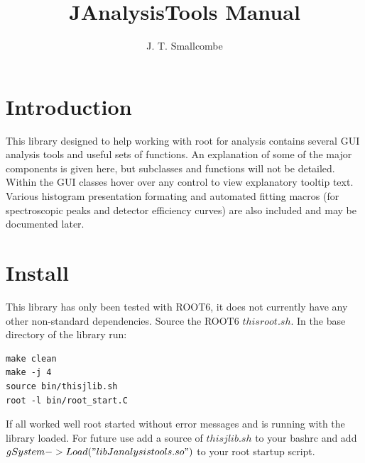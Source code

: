 \documentclass[a4paper,10pt]{article}
\title{JAnalysisTools Manual}
\author{J. T. Smallcombe}
\begin{document}
\maketitle
\tableofcontents

\section{Introduction}
This library designed to help working with root for analysis contains several GUI analysis tools and useful sets of functions. An explanation of some of the major components is given here, but subclasses and functions will not be detailed.
Within the GUI classes hover over any control to view explanatory tooltip text.
Various histogram presentation formating and automated fitting macros (for spectroscopic peaks and detector efficiency curves) are also included and may be documented later. 

\section{Install}
This library has only been tested with ROOT6, it does not currently have any other non-standard dependencies.
Source the ROOT6 $thisroot.sh$.
In the base directory of the library run:
\lstset{language=bash}
\begin{lstlisting}
make clean
make -j 4
source bin/thisjlib.sh
root -l bin/root_start.C
\end{lstlisting}
If all worked well root started without error messages and is running with the library loaded.
For future use add a source of $thisjlib.sh$ to your bashrc and add $gSystem->Load("libJanalysistools.so")$ to your root startup script.
\end{document}
